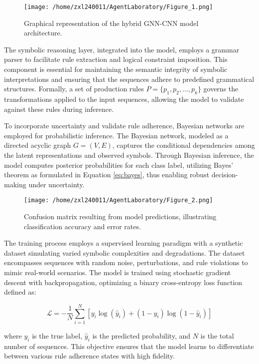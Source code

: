 \documentclass{article}
\begin{document}
\begin{figure}[h]
\caption{Graphical representation of the hybrid GNN-CNN model architecture.}
\centering
\texttt{[image: /home/zxl240011/AgentLaboratory/Figure\_1.png]}
\label{fig:gnn_cnn_architecture}
\end{figure}

The symbolic reasoning layer, integrated into the model, employs a grammar parser to facilitate rule extraction and logical constraint imposition. This component is essential for maintaining the semantic integrity of symbolic interpretations and ensuring that the sequences adhere to predefined grammatical structures. Formally, a set of production rules \(P = \{p_1, p_2, \ldots, p_k\}\) governs the transformations applied to the input sequences, allowing the model to validate against these rules during inference.

To incorporate uncertainty and validate rule adherence, Bayesian networks are employed for probabilistic inference. The Bayesian network, modeled as a directed acyclic graph \(G = (V, E)\), captures the conditional dependencies among the latent representations and observed symbols. Through Bayesian inference, the model computes posterior probabilities for each class label, utilizing Bayes' theorem as formulated in Equation \ref{eq:bayes}, thus enabling robust decision-making under uncertainty.

\begin{figure}[h]
\caption{Confusion matrix resulting from model predictions, illustrating classification accuracy and error rates.}
\centering
\texttt{[image: /home/zxl240011/AgentLaboratory/Figure\_2.png]}
\label{fig:confusion_matrix}
\end{figure}

The training process employs a supervised learning paradigm with a synthetic dataset simulating varied symbolic complexities and degradations. The dataset encompasses sequences with random noise, perturbations, and rule violations to mimic real-world scenarios. The model is trained using stochastic gradient descent with backpropagation, optimizing a binary cross-entropy loss function defined as:

\[
\mathcal{L} = -\frac{1}{N}\sum_{i=1}^{N}\left[y_i \log(\hat{y}_i) + (1-y_i)\log(1-\hat{y}_i)\right]
\]

where \(y_i\) is the true label, \(\hat{y}_i\) is the predicted probability, and \(N\) is the total number of sequences. This objective ensures that the model learns to differentiate between various rule adherence states with high fidelity.
\end{document}
